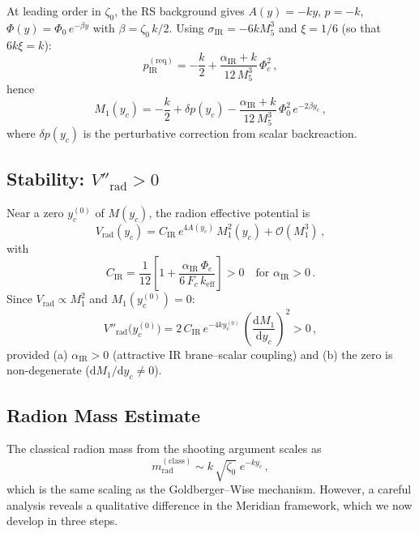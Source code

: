 At leading order in $\zeta_0$, the RS background gives $A(y) = -ky$, $p = -k$, $\Phi(y) = \Phi_0\,e^{-\beta y}$ with $\beta = \zeta_0\,k/2$. Using $\sigma_{\mathrm{IR}} = -6kM_5^3$ and $\xi = 1/6$ (so that $6k\xi = k$):
\begin{equation}
  p_{\mathrm{IR}}^{(\mathrm{req})} = -\frac{k}{2} + \frac{\alpha_{\mathrm{IR}} + k}{12\,M_5^3}\,\Phi_c^2\,,
\end{equation}
hence
\begin{equation}
  M_1(y_c) = -\frac{k}{2} + \delta p(y_c) - \frac{\alpha_{\mathrm{IR}} + k}{12\,M_5^3}\,\Phi_0^2\,e^{-2\beta y_c}\,,
\end{equation}
where $\delta p(y_c)$ is the perturbative correction from scalar backreaction.

\subsection{Stability: $V''_{\mathrm{rad}} > 0$}

Near a zero $y_c^{(0)}$ of $M(y_c)$, the radion effective potential is
\begin{equation}
  V_{\mathrm{rad}}(y_c) = C_{\mathrm{IR}}\,e^{4A(y_c)}\,M_1^2(y_c) + \mathcal{O}(M_1^3)\,,
\end{equation}
with
\begin{equation}
  C_{\mathrm{IR}} = \frac{1}{12}\left[1 + \frac{\alpha_{\mathrm{IR}}\,\Phi_c}{6\,F_c\,k_{\mathrm{eff}}}\right] > 0 \quad \text{for } \alpha_{\mathrm{IR}} > 0\,.
\end{equation}
Since $V_{\mathrm{rad}} \propto M_1^2$ and $M_1(y_c^{(0)}) = 0$:
\begin{equation}
  V''_{\mathrm{rad}}\bigl(y_c^{(0)}\bigr) = 2\,C_{\mathrm{IR}}\,e^{-4ky_c^{(0)}}\,\left(\frac{\mathrm{d}M_1}{\mathrm{d}y_c}\right)^{\!2} > 0\,,
\end{equation}
provided (a) $\alpha_{\mathrm{IR}} > 0$ (attractive IR brane--scalar coupling) and (b) the zero is non-degenerate ($\mathrm{d}M_1/\mathrm{d}y_c \neq 0$).

\subsection{Radion Mass Estimate}

The classical radion mass from the shooting argument scales as
\begin{equation}
  m_{\mathrm{rad}}^{(\mathrm{class})} \sim k\,\sqrt{\zeta_0}\;e^{-ky_c}\,,
\end{equation}
which is the same scaling as the Goldberger--Wise mechanism. However, a careful analysis reveals a qualitative difference in the Meridian framework, which we now develop in three steps.

